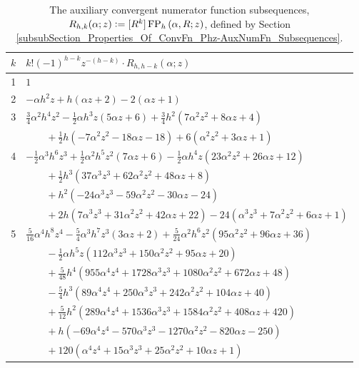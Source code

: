 \documentclass[12pt,reqno]{article}
\numberwithin{sfootnote}{section}
\numberwithin{equation}{section}
\theoremstyle{plain}
\theoremstyle{definition}
\theoremstyle{remark}
\newcommand{\defequals}{\ensuremath{\vcentcolon=}}
\newcommand{\ConvFP}[4]{\ensuremath{\FP_{#1}\left(#2, #3; #4\right)}}
\DeclareMathOperator{\FP}{FP}
\begin{document}
\begin{table}[h]
\begin{subtable}{\textwidth}
\begin{tabular}{|c|l|}
$k$ & $k! (-1)^{h-k} z^{-(h-k)} \cdot R_{h,h-k}(\alpha; z)$ \\ \hline 
1 & $1$ \\ 
2 & $-\alpha h^2 z+h (\alpha  z+2)-2 (\alpha  z+1)$ \\ 
3 & $\frac{3}{4} \alpha ^2 h^4 z^2- 
     \frac{1}{2} \alpha  h^3 z (5 \alpha  z+6)+ 
     \frac{3}{4} h^2 \left(7 \alpha ^2 z^2+8 \alpha  z+4\right)$ \\ 
  & $\qquad + 
     \frac{1}{2} h \left(-7 \alpha ^2 z^2-18 \alpha z- 
     18\right)+6 \left(\alpha ^2 z^2+3 \alpha  z+1\right)$ \\ 
4 & $-\frac{1}{2} \alpha ^3 h^6 z^3 + 
     \frac{1}{2} \alpha ^2 h^5 z^2 (7 \alpha  z+6) - 
     \frac{1}{2} \alpha  h^4 z \left(23 \alpha ^2 z^2+26 \alpha  z+12\right)$ \\ 
  & $\qquad + 
     \frac{1}{2} h^3 \left(37 \alpha ^3 z^3+62 \alpha ^2 z^2+ 
     48 \alpha  z+8\right)$ \\ 
  & $\qquad + 
     h^2 \left(-24 \alpha ^3 z^3-59 \alpha ^2 z^2-30 \alpha  z-24\right)$ \\ 
  & $\qquad + 
     2 h \left(7 \alpha ^3 z^3+31 \alpha ^2 z^2+42 \alpha  z+ 
     22\right)-24 \left(\alpha ^3 z^3+7 \alpha ^2 z^2+6 \alpha  z+1\right)$ \\ 
5 & $\frac{5}{16} \alpha ^4 h^8 z^4- 
     \frac{5}{4} \alpha ^3 h^7 z^3 (3 \alpha  z+2)+ 
     \frac{5}{24} \alpha ^2 h^6 z^2 \left(95 \alpha ^2 z^2+96 \alpha z+ 
     36\right)$ \\ 
  & $\qquad - 
     \frac{1}{2} \alpha  h^5 z \left(112 \alpha ^3 z^3+150 \alpha ^2 z^2+ 
     95 \alpha  z+20\right)$ \\ 
  & $\qquad + 
     \frac{5}{48} h^4 \left(955 \alpha ^4 z^4+1728 \alpha ^3 z^3+ 
     1080 \alpha ^2 z^2+672 \alpha  z+48\right)$ \\ 
  & $\qquad - 
     \frac{5}{4} h^3 \left(89 \alpha ^4 z^4+250 \alpha ^3 z^3+ 
     242 \alpha ^2 z^2+104 \alpha  z+40\right)$ \\ 
  & $\qquad + 
     \frac{5}{12} h^2 \left(289 \alpha ^4 z^4+1536 \alpha ^3 z^3+ 
     1584 \alpha ^2 z^2+408 \alpha  z+420\right)$ \\ 
  & $\qquad + 
     h \left(-69 \alpha ^4 z^4-570 \alpha ^3 z^3-1270 \alpha ^2 z^2- 
     820 \alpha  z-250\right)$ \\ 
  & $\qquad + 
     120 \left(\alpha ^4 z^4+15 \alpha ^3 z^3+25 \alpha ^2 z^2+ 
     10 \alpha  z+1\right)$ \\ \hline 
\hline 
\end{tabular} 

\end{subtable} 

\caption{The auxiliary convergent numerator function subsequences, 
         $R_{h,k}(\alpha; z) \defequals [R^k] \ConvFP{h}{\alpha}{R}{z}$, 
         defined by 
         Section \ref{subsubSection_Properties_Of_ConvFn_Phz-AuxNumFn_Subsequences}.}
\label{table_ConvNumFnSeqs_Rhk_Alphaz_SpCaseListings} 

\end{table} 
\end{document}
